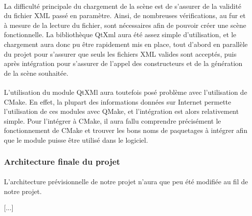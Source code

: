 \paragraph{}
La difficulté principale du chargement de la scène est de s'assurer de la validité du fichier XML passé en paramètre. Ainsi, de nombreuses vérifications, au fur et à mesure de la lecture du fichier, sont nécessaires afin de pouvoir créer une scène fonctionnelle. La bibliothèque QtXml aura été assez simple d'utilisation, et le chargement aura donc pu être rapidement mis en place, tout d'abord en parallèle du projet pour s'assurer que seuls les fichiers XML valides sont acceptés, puis après intégration pour s'assurer de l'appel des constructeurs et de la génération de la scène souhaitée.

\paragraph{}
L'utilisation du module QtXMl aura toutefois posé problème avec l'utilisation de CMake. En effet, la plupart des informations données sur Internet permette l'utilisation de ces modules avec QMake, et l'intégration est alors relativement simple. Pour l'intégrer à CMake, il aura fallu comprendre précisément le fonctionnement de CMake et trouver les bons noms de paquetages à intégrer afin que le module puisse être utilisé dans le logiciel.

\subsubsection{Architecture finale du projet}
\paragraph{}
L'architecture prévisionnelle de notre projet n'aura que peu été modifiée au fil de notre projet.

[...]
